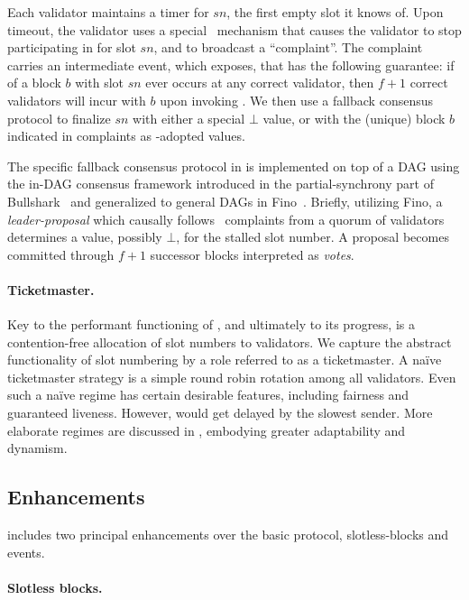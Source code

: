 Each validator maintains a timer for $sn$, the first empty slot it knows of.
Upon timeout, the validator uses a special \finalize\ mechanism 
that causes the validator to stop participating in \primitive for slot $sn$, 
and to broadcast a ``complaint''.
The complaint carries an intermediate \bbcaadopt event, which \primitive exposes, 
that has the following guarantee:
if \bbcadeliver of a block $b$ with slot $sn$ ever occurs at any correct validator, 
then $f+1$ correct validators will incur \bbcaadopt with $b$ upon invoking \finalize.
We then use a fallback consensus protocol to finalize $sn$ with either a special $\bot$ value, 
or with the (unique) block $b$ indicated in complaints as \finalize-adopted values.

The specific fallback consensus protocol in \system is implemented on top of a DAG using the in-DAG consensus framework introduced in 
the partial-synchrony part of Bullshark~\cite{spiegelman2022bullshark} and generalized to general DAGs in Fino~\cite{fino}.
%
Briefly, utilizing Fino, 
a \emph{leader-proposal} which causally follows \finalize\ complaints from a quorum of validators determines a value, possibly $\bot$, for the stalled slot number.
A proposal becomes committed through $f+1$ successor blocks interpreted as \emph{votes}. 


\paragraph{Ticketmaster.}
Key to the performant functioning of \system, and ultimately to its progress,
is a contention-free allocation of slot numbers to validators. 
We capture the abstract functionality of slot numbering by a role referred to as a ticketmaster.
A naïve ticketmaster strategy is a simple round robin rotation among all validators.
Even such a naïve regime has certain desirable features, including fairness and guaranteed liveness.
However, \system would get delayed by the slowest sender.
More elaborate regimes are discussed in , embodying greater adaptability and dynamism.

\subsection{Enhancements}

\system includes two principal enhancements over the basic protocol, slotless-blocks and \eagercommit events.

\paragraph{Slotless blocks.}

